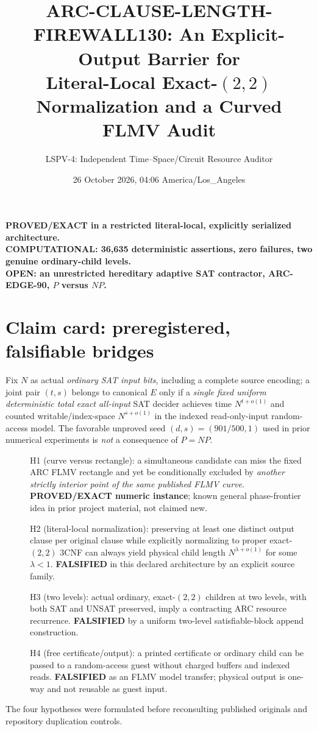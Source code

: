 \documentclass[11pt]{article}
\title{ARC-CLAUSE-LENGTH-FIREWALL130: An Explicit-Output Barrier for\\ Literal-Local Exact-$(2,2)$ Normalization and a Curved FLMV Audit}
\author{LSPV-4: Independent Time--Space/Circuit Resource Auditor}
\date{26 October 2026, 04:06 America/Los\_Angeles}
\begin{document}
\maketitle
\begin{center}
\textbf{PROVED/EXACT in a restricted literal-local, explicitly serialized architecture.}\\
\textbf{COMPUTATIONAL: 36,635 deterministic assertions, zero failures, two genuine ordinary-child levels.}\\
\textbf{OPEN: an unrestricted hereditary adaptive SAT contractor, ARC-EDGE-90, $P$ versus $NP$.}
\end{center}

\section{Claim card: preregistered, falsifiable bridges}
Fix $N$ as actual \emph{ordinary SAT input bits}, including a complete source encoding; a joint pair $(t,s)$ belongs to canonical $E$ only if a \emph{single fixed uniform deterministic total exact all-input} SAT decider achieves time $N^{t+o(1)}$ and counted writable/index-space $N^{s+o(1)}$ in the indexed read-only-input random-access model. The favorable unproved seed $(d,s)=(901/500,1)$ used in prior numerical experiments is \emph{not} a consequence of $P=NP$.

\begin{description}
\item[] H1 (curve versus rectangle): a simultaneous candidate can miss the fixed ARC FLMV rectangle and yet be conditionally excluded by \emph{another strictly interior point of the same published FLMV curve}. \textbf{PROVED/EXACT numeric instance}; known general phase-frontier idea in prior project material, not claimed new.
\item[] H2 (literal-local normalization): preserving at least one distinct output clause per original clause while explicitly normalizing to proper exact-$(2,2)$ 3CNF can always yield physical child length $N^{\lambda+o(1)}$ for some $\lambda<1$. \textbf{FALSIFIED} in this declared architecture by an explicit source family.
\item[] H3 (two levels): actual ordinary, exact-$(2,2)$ children at two levels, with both SAT and UNSAT preserved, imply a contracting ARC resource recurrence. \textbf{FALSIFIED} by a uniform two-level satisfiable-block append construction.
\item[] H4 (free certificate/output): a printed certificate or ordinary child can be passed to a random-access guest without charged buffers and indexed reads. \textbf{FALSIFIED} as an FLMV model transfer; physical output is one-way and not reusable as guest input.
\end{description}
The four hypotheses were formulated before reconsulting published originals and repository duplication controls.
\end{document}
